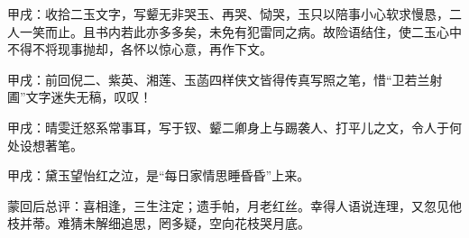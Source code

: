 \begin{parag}


    \begin{note}甲戌：收拾二玉文字，写颦无非哭玉、再哭、恸哭，玉只以陪事小心软求慢恳，二人一笑而止。且书内若此亦多多矣，未免有犯雷同之病。故险语结住，使二玉心中不得不将现事抛却，各怀以惊心意，再作下文。\end{note}
\end{parag}


\begin{parag}


    \begin{note}甲戌：前回倪二、紫英、湘莲、玉菡四样侠文皆得传真写照之笔，惜“卫若兰射圃”文字迷失无稿，叹叹！\end{note}
\end{parag}


\begin{parag}


    \begin{note}甲戌：晴雯迁怒系常事耳，写于钗、颦二卿身上与踢袭人、打平儿之文，令人于何处设想著笔。\end{note}
\end{parag}


\begin{parag}


    \begin{note}甲戌：黛玉望怡红之泣，是“每日家情思睡昏昏”上来。\end{note}
\end{parag}

\begin{parag}

    \begin{note}蒙回后总评：喜相逢，三生注定；遗手帕，月老红丝。幸得人语说连理，又忽见他枝并蒂。难猜未解细追思，罔多疑，空向花枝哭月底。\end{note}
\end{parag}

